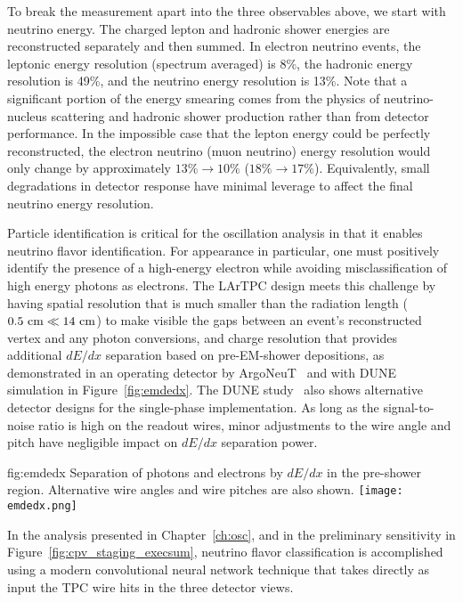 To break the measurement apart into the three
observables above, we start with neutrino energy.
The charged lepton and hadronic shower energies are
reconstructed separately and then summed.  In electron
neutrino events, the leptonic energy resolution
(spectrum averaged) is 8\%, the hadronic energy resolution
is 49\%, and the neutrino energy resolution is 13\%.
Note that a significant portion of the energy smearing
comes from the physics of neutrino-nucleus scattering
and hadronic shower production rather than from detector
performance.  In the impossible case that the lepton
energy could be perfectly reconstructed, the electron
neutrino (muon neutrino) energy resolution would only
change by approximately $13\%\rightarrow 10\%$ 
($18\%\rightarrow 17\%$).
Equivalently, small degradations in detector response
have minimal leverage to affect the final neutrino energy
resolution.

Particle identification is critical for the oscillation analysis 
in that it enables neutrino flavor identification.  
For \nue{} appearance in particular, one
must positively identify the presence of a high-energy
electron while avoiding misclassification of high energy
photons as electrons. The LArTPC design meets this challenge
by having spatial resolution that is much smaller than the
radiation length ($0.5~\rm{cm} \ll 14~\rm{cm}$) to make
visible the gaps between an event's reconstructed vertex
and any photon conversions, and charge resolution that
provides additional $dE/dx$ separation based on pre-EM-shower
depositions, as demonstrated in an operating detector by
ArgoNeuT~\cite{Acciarri:2016sli} and with DUNE simulation
in Figure~\ref{fig:emdedx}.  The DUNE study~\cite{bib:docdb3384}
also shows alternative detector designs for the 
single-phase \lartpc implementation.  As long as
the signal-to-noise ratio is high on the readout wires,
minor adjustments to the wire angle and pitch have negligible
impact on $dE/dx$ separation power.
%
\begin{dunefigure}
{fig:emdedx}
{Separation of photons and electrons by $dE/dx$
in the pre-shower region.  Alternative wire angles and wire
pitches are also shown.}
  \texttt{[image: emdedx.png]}
\end{dunefigure}

In the analysis presented in Chapter~\ref{ch:osc}, and in
the preliminary  sensitivity in
Figure~\ref{fig:cpv_staging_execsum}, neutrino flavor classification
is accomplished using a modern convolutional neural network
technique that takes directly as input the TPC wire hits
in the three detector views.

